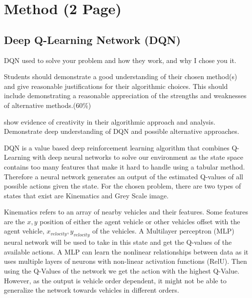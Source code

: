 \documentclass{article}
\begin{document}
\section{Method (2 Page)}



\subsection{Deep Q-Learning Network (DQN)}

DQN used to solve your problem and how they work, and why I chose you it.

Students should demonstrate a good understanding of their chosen method(s) and give reasonable justifications for their algorithmic choices. 
This should include demonstrating a reasonable appreciation of the strengths and weaknesses of alternative methods.(60\%)

show evidence of creativity in their algorithmic approach and analysis.
Demonstrate deep understanding of DQN and possible alternative approaches. 

DQN is a value based deep reinforcement learning algorithm that combines Q-Learning with deep neural networks to solve our environment as the state space contains too many features that make it hard to handle using a tabular method.
Therefore a neural network generates an output of the estimated Q-values of all possible actions given the state.
For the chosen problem, there are two types of states that exist are Kinematics and Grey Scale image.

Kinematics refers to an array of nearby vehicles and their features. Some features are the \(x, y\) position of either the agent vehicle or other vehicles offset with the agent vehicle, \(x_{velocity}, y_{velocity}\) of the vehicles.
A Multilayer perceptron (MLP) neural network will be used to take in this state and get the Q-values of the available actions.
A MLP can learn the nonlinear relationships between data as it uses multiple layers of neurons with non-linear activation functions (RelU).
Then using the Q-Values of the network we get the action with the highest Q-Value.
However, as the output is vehicle order dependent, it might not be able to generalize the network towards vehicles in different orders.
\end{document}
